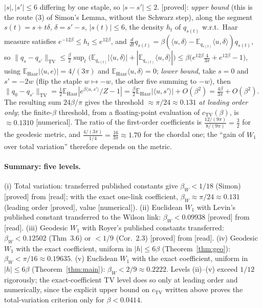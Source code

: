 \documentclass[11pt,a4paper]{article}
\theoremstyle{remark}
\theoremstyle{definition}
\theoremstyle{plain}
\theoremstyle{remark}
\newcommand{\E}{\mathbb{E}}
\newcommand{\st}[1]{\textsf{[#1]}}
\begin{document}
$|s|,|s'|\le6$ differing by one staple, so $|s-s'|\le2$. \st{proved}: \emph{upper bound} (this is the route
(3) of Simon's Lemma, without the Schwarz step), along the segment
$s(t)=s+t\delta$, $\delta=s'-s$, $|s(t)|\le6$, the density $h_t$ of $q_{s(t)}$ w.r.t.\ Haar measure satisfies
$e^{-12\beta}\le h_t\le e^{12\beta}$, and $\frac{d}{dt}q_{s(t)}=\beta(\langle u,\delta\rangle-\E_{q_{s(t)}}\langle u,\delta\rangle)q_{s(t)}$,
so $\|q_s-q_{s'}\|_{\mathrm{TV}}\le\frac\beta2\sup_t\big(\E_{q_{s(t)}}|\langle u,\delta\rangle|+|\E_{q_{s(t)}}\langle u,\delta\rangle|\big)
\le\beta\big(e^{12\beta}\tfrac{4}{3\pi}+e^{12\beta}-1\big)$, using $\E_{\mathrm{Haar}}|\langle u,e\rangle|=4/(3\pi)$ and
$\E_{\mathrm{Haar}}\langle u,\delta\rangle=0$; \emph{lower bound}, take $s=0$ and $s'=-2w$ (flip the staple
$w\mapsto-w$, the other five summing to $-w$), then $\|q_0-q_{s'}\|_{\mathrm{TV}}=\frac12\E_{\mathrm{Haar}}|e^{\beta\langle u,s'\rangle}/Z-1|
=\frac\beta2\E_{\mathrm{Haar}}|\langle u,s'\rangle|+O(\beta^2)=\frac{4\beta}{3\pi}+O(\beta^2)$. The resulting sum
$24\beta/\pi$ gives the threshold $\approx\pi/24\approx0.131$ \emph{at leading order only}; the finite-$\beta$
threshold, from a floating-point evaluation of $c_{\mathrm{TV}}(\beta)$, is $\approx0.1310$ \st{numerical}.
The ratio of the first-order coefficients is $\frac{12/(9\pi)}{8/(9\pi)}=\frac32$ for the geodesic metric, and
$\frac{4/(3\pi)}{1/4}=\frac{16}{3\pi}\approx1.70$ for the chordal one; the ``gain of $W_1$ over total variation''
therefore depends on the metric.

\paragraph{Summary: five levels.} (i) Total variation: transferred published constants give $\beta_W<1/18$
(Simon) \st{proved} from \st{read}; with the exact one-link coefficient, $\beta_W\approx\pi/24\approx0.131$
(leading order \st{proved}, value \st{numerical}). (ii) Euclidean $W_1$ with Levin's published constant
transferred to the Wilson link: $\beta_W<0.09938$ \st{proved} from \st{read}. (iii) Geodesic $W_1$ with Royer's
published constants transferred: $\beta_W<0.12502$ (Thm~3.6) or $<1/9$ (Cor.~2.3) \st{proved} from \st{read}.
(iv) Geodesic $W_1$ with the exact coefficient, uniform in $|h|\le6\beta$ (Theorem~\ref{thm:geo}):
$\beta_W<\pi/16\approx0.19635$. (v) Euclidean $W_1$ with the exact coefficient, uniform in $|h|\le6\beta$
(Theorem~\ref{thm:main}): $\beta_W<2/9\approx0.2222$. Levels (ii)--(v) exceed $1/12$ rigorously; the
exact-coefficient TV level does so only at leading order and numerically, since the explicit upper bound on
$c_{\mathrm{TV}}$ written above proves the total-variation criterion only for $\beta<0.0414$.
\end{document}
